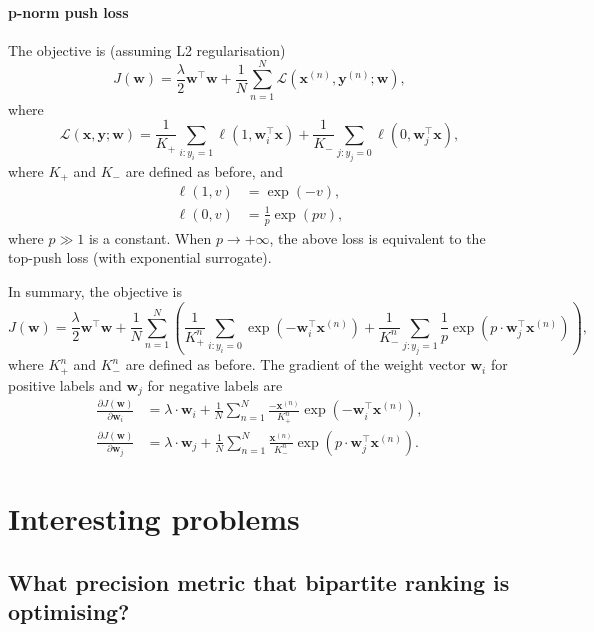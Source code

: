 \documentclass[9pt]{extarticle}
\newcommand{\x}{\mathbf{x}}
\newcommand{\y}{\mathbf{y}}
\newcommand{\1}{\mathbf{1}}
\newcommand{\w}{\mathbf{w}}
\newcommand{\LCal}{\mathcal{L}}
\newcommand{\pb}[1]{^{({#1})}}
\begin{document}
\paragraph{p-norm push loss}
The objective is (assuming L2 regularisation)
\begin{equation*}
J(\w) = \frac{\lambda}{2}\w^\top \w + \frac{1}{N} \sum_{n=1}^N \LCal(\x\pb{n}, \y\pb{n}; \w),
\end{equation*}
where
\begin{equation*}
\LCal(\x, \y; \w) = \frac{1}{K_+} \sum_{i:y_i=1} \ell(1, \w_i^\top \x) + \frac{1}{K_-} \sum_{j:y_j=0} \ell(0, \w_j^\top \x),
\end{equation*}
where $K_+$ and $K_-$ are defined as before, and
\begin{align}
\ell(1, v) & = \exp(-v), \\
\ell(0, v) & = \frac{1}{p} \exp(pv),
\end{align}
where $p \gg 1$ is a constant.
When $p \to +\infty$, the above loss is equivalent to the top-push loss (with exponential surrogate).

In summary, the objective is
\begin{equation}
\label{eq:obj_pnorm_push}
J(\w) = \frac{\lambda}{2} \w^\top \w + \frac{1}{N} \sum_{n=1}^N \left( \frac{1}{K_+^n} \sum_{i:y_i=0} \exp(-\w_i^\top \x\pb{n}) + 
        \frac{1}{K_-^n} \sum_{j:y_j=1} \frac{1}{p} \exp(p \cdot \w_j^\top \x\pb{n}) \right), 
\end{equation}
where $K_+^n$ and $K_-^n$ are defined as before.
The gradient of the weight vector $\w_i$ for positive labels and $\w_j$ for negative labels are
\begin{align}
\frac{\partial J(\w)}{\partial \w_i} & = \lambda \cdot \w_i + \frac{1}{N} \sum_{n=1}^N \frac{-\x\pb{n}}{K_+^n} \exp(-\w_i^\top \x\pb{n}), \\
\frac{\partial J(\w)}{\partial \w_j} & = \lambda \cdot \w_j + \frac{1}{N} \sum_{n=1}^N \frac{\x\pb{n}}{K_-^n} \exp(p \cdot \w_j^\top \x\pb{n}).
\end{align}


\newpage
\thispagestyle{empty}

\section*{Interesting problems}

\subsection*{What precision metric that bipartite ranking is optimising?}
\end{document}
